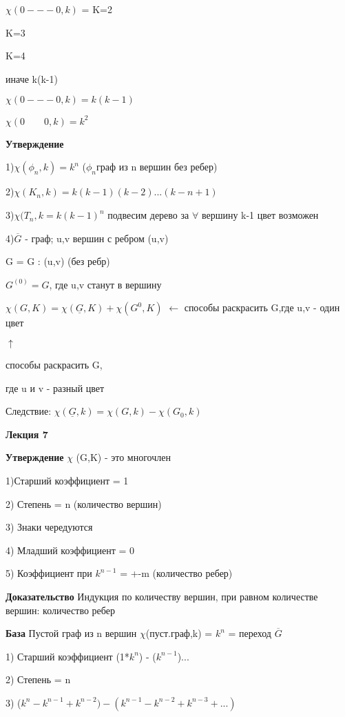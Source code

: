 \documentclass{article}
\begin{document}
	$\chi (0---0,k)$ = \qquad K=2 
	
	\qquad \qquad \qquad \qquad \qquad K=3 
	
	 \qquad \qquad \qquad \qquad \qquad K=4 
	 
	 иначе k(k-1)
	 
	 $\chi (0---0,k) = k(k-1)$
	 
	 $\chi (0 \qquad 0, k) = k^{2}$
	 
	 \textbf{Утверждение} 
	 
	 1)$\chi(\phi_{n},k) = k^{n}$ ($\phi_{n}$граф из n вершин без ребер) 
	 
	 2)$\chi(K_{n}, k) = k(k-1)(k-2)...(k-n+1)$
	 
	 3)$\chi(T_{n},k = k(k-1)^{n}$ подвесим дерево за $\forall$ вершину k-1 цвет возможен
	 
	 4)$\overline{G}$ - граф; u,v вершин с ребром (u,v)
	 
	 G = G : (u,v) (без ребр)
	 
	 $G^(0) = G$, где u,v станут в вершину
	 
	 $\chi (G,K) = \chi (\underline{G},K) + \chi(G^{0},K)$ $\leftarrow$ способы раскрасить G,где u,v - один цвет
	 
	 \qquad \qquad \qquad \qquad $\uparrow$
	 
	 \qquad \qquad  способы  раскрасить G, 
			
	\qquad \qquad		где u и v - разный цвет
	
	Следствие: $\chi (\underline{G},k) = \chi(G,k) - \chi(G_{0},k)$
	
	\textbf{Лекция  7}
	
	\textbf{Утверждение} $\chi$ (G,K) - это многочлен
	
	1)Старший коэффициент  = 1
	
	2) Степень = n (количество вершин)
	
	3) Знаки чередуются
	
	4) Младший коэффициент = 0
	
	5) Коэффициент при $k^{n-1}$ = +-m (количество ребер)
	
	\textbf{Доказательство} Индукция по количеству вершин, при равном количестве вершин: количество ребер
	
	\textbf{База} Пустой граф из n вершин $\chi$(пуст.граф,k) = $k^{n}$ = переход $\overline{G}$
	
	1) Старший коэффициент (1*$k^{n}$) - ($k^{n-1}$)...
	
	2) Степень = n
	
	3) ($k^{n} - k^{n-1} + k^{n-2}) - (k^{n-1} - k^{n-2} + k^{n-3}+...)$
	
\end{document}
